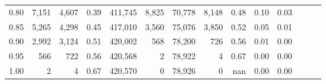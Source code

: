 \begin{tabular}{rrrrrrrrrrrrrr}
0.80 &   7,151 &  4,607 &  0.39 &  411,745 &    8,825 &  70,778 &   8,148 &  0.48 &  0.10 &      0.03 \\
0.85 &   5,265 &  4,298 &  0.45 &  417,010 &    3,560 &  75,076 &   3,850 &  0.52 &  0.05 &      0.01 \\
0.90 &   2,992 &  3,124 &  0.51 &  420,002 &      568 &  78,200 &     726 &  0.56 &  0.01 &      0.00 \\
0.95 &     566 &    722 &  0.56 &  420,568 &        2 &  78,922 &       4 &  0.67 &  0.00 &      0.00 \\
1.00 &       2 &      4 &  0.67 &  420,570 &        0 &  78,926 &       0 &   nan &  0.00 &      0.00 \\
\bottomrule
\end{tabular}
